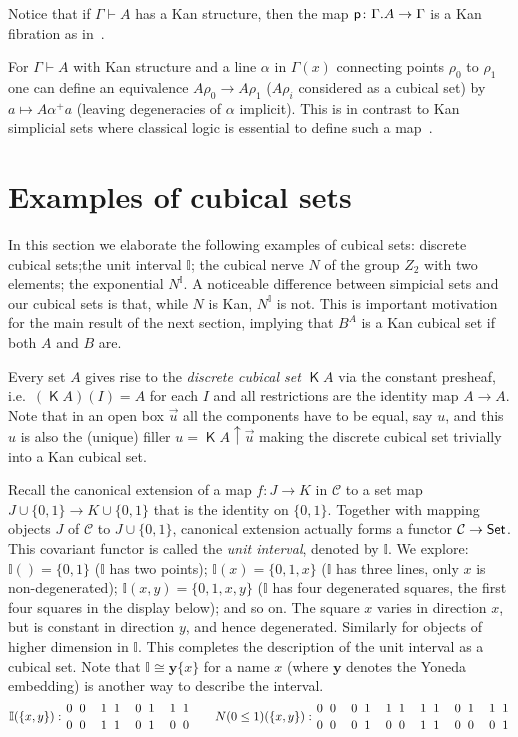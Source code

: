 \documentclass[10pt,a4paper]{article}
\newcommand{\CC}{{\mathcal C}}
\newcommand{\pp}{{\sf p}}
\newcommand{\set}[1]{\{#1\}}
\newcommand{\rup}[1]{#1{\uparrow}}
\newcommand{\yoneda}{\mathbf{y}}
\newcommand{\interval}{\mathbb{I}}
\DeclareMathOperator{\discr}{\mathsf{K}}
\begin{document}
Notice that if $\Gamma \vdash A$ has a Kan structure, then the map
$\pp \colon \Gamma.A \to \Gamma$ is a Kan fibration as in~\cite{Kan,
  Williamson}.

For $\Gamma \vdash A$ with Kan structure and a line $\alpha$ in
$\Gamma (x)$ connecting points $\rho_0$ to $\rho_1$ one can define an
equivalence $A \rho_0 \to A \rho_1$ ($A\rho_i$ considered as a cubical
set) by $a \mapsto A \alpha^+ a$ (leaving degeneracies of $\alpha$
implicit).  This is in contrast to Kan simplicial sets where classical
logic is essential to define such a map~\cite{BC}.


\section{Examples of cubical sets}\label{sec:examples}
In this section we elaborate the following examples of cubical sets:
discrete cubical sets;the unit interval $\interval$; the cubical nerve
$N$ of the group $Z_2$ with two elements; the exponential
$N^\interval$.  A noticeable difference between simpicial sets and our
cubical sets is that, while $N$ is Kan, $N^\interval$ is not.  This is
important motivation for the main result of the next section, implying
that $B^A$ is a Kan cubical set if both $A$ and $B$ are.

Every set $A$ gives rise to the \emph{discrete cubical set} $\discr A$
via the constant presheaf, i.e.\ $(\discr A) (I) = A$ for each $I$ and
all restrictions are the identity map $A \to A$.  Note that in an open
box $\vec u$ all the components have to be equal, say $u$, and this
$u$ is also the (unique) filler $u = \rup {\discr A} {\vec u}$ making
the discrete cubical set trivially into a Kan cubical set.

Recall the canonical extension of a map $f:J\to K$ in $\CC$ to a set
map $J \cup \set{0,1} \to K\cup \set{0,1}$ that is the identity on
$\set{0,1}$.  Together with mapping objects $J$ of $\CC$ to $J \cup
\set{0,1}$, canonical extension actually forms a functor $\CC\to{\sf
  Set}$.  This covariant functor is called the \emph{unit interval},
denoted by $\interval$.  We explore: $\interval()=\set{0,1}$
($\interval$ has two points); $\interval(x)=\set{0,1,x}$ ($\interval$
has three lines, only $x$ is non-degenerated); $\interval(x,y) =
\set{0,1,x,y}$ ($\interval$ has four degenerated squares, the first
four squares in the display below); and so on.  The square $x$ varies
in direction $x$, but is constant in direction $y$, and hence
degenerated.  Similarly for objects of higher dimension in
$\interval$.  This completes the description of the unit interval as a
cubical set.  Note that $\interval \cong \yoneda \set{x}$ for a name
$x$ (where $\yoneda$ denotes the Yoneda embedding) is another way to
describe the interval.
\[
\def\olll{{1 \atop 0} ~ {1 \atop 1}}
\def\oool{{0 \atop 0} ~ {1 \atop 0}}
\def\oooo{{0 \atop 0} ~ {0 \atop 0}}
\def\llll{{1 \atop 1} ~ {1 \atop 1}}
\def\olol{{1 \atop 0} ~ {1 \atop 0}}
\def\ooll{{0 \atop 0} ~ {1 \atop 1}}
\def\Fxy{{0 \atop 0} ~ {0 \atop 0}}
\def\Txy{{1 \atop 1} ~ {1 \atop 1}}
\def\Iy{{1 \atop 0} ~ {1 \atop 0}}
\def\Ix{{0 \atop 0} ~ {1 \atop 1}}
\interval(\set{x,y}):\Fxy\quad\Txy\quad\Ix\quad\Iy\quad\quad
N(0\leq1)(\set{x,y}):\oooo\quad\ooll\quad\olol\quad\llll\quad\oool\quad\olll\]
\end{document}

